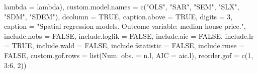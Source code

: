 \documentclass[
  letterpaper,
]{scrbook}
\newenvironment{Shaded}{\begin{snugshade}}{\end{snugshade}}
\newcommand{\AttributeTok}[1]{\textcolor[rgb]{0.40,0.45,0.13}{#1}}
\newcommand{\ConstantTok}[1]{\textcolor[rgb]{0.56,0.35,0.01}{#1}}
\newcommand{\DecValTok}[1]{\textcolor[rgb]{0.68,0.00,0.00}{#1}}
\newcommand{\FunctionTok}[1]{\textcolor[rgb]{0.28,0.35,0.67}{#1}}
\newcommand{\NormalTok}[1]{\textcolor[rgb]{0.00,0.23,0.31}{#1}}
\newcommand{\OtherTok}[1]{\textcolor[rgb]{0.00,0.23,0.31}{#1}}
\newcommand{\SpecialCharTok}[1]{\textcolor[rgb]{0.37,0.37,0.37}{#1}}
\newcommand{\StringTok}[1]{\textcolor[rgb]{0.13,0.47,0.30}{#1}}
\begin{document}
\begin{Shaded}
\begin{Highlighting}[]
                                 \StringTok{\textquotesingle{}lambda\textquotesingle{}} \OtherTok{=} \StringTok{\textquotesingle{}lambda\textquotesingle{}}\NormalTok{),}
          \AttributeTok{custom.model.names =} \FunctionTok{c}\NormalTok{(}\StringTok{"OLS"}\NormalTok{, }\StringTok{"SAR"}\NormalTok{, }\StringTok{"SEM"}\NormalTok{, }\StringTok{"SLX"}\NormalTok{, }\StringTok{"SDM"}\NormalTok{, }\StringTok{"SDEM"}\NormalTok{),}
          \AttributeTok{dcolumn =} \ConstantTok{TRUE}\NormalTok{, }\AttributeTok{caption.above =} \ConstantTok{TRUE}\NormalTok{, }\AttributeTok{digits =} \DecValTok{3}\NormalTok{,}
          \AttributeTok{caption =} \StringTok{"Spatial regression models. Outcome variable: median house price."}\NormalTok{,}
          \AttributeTok{include.nobs =} \ConstantTok{FALSE}\NormalTok{,}
  \AttributeTok{include.loglik =} \ConstantTok{FALSE}\NormalTok{,}
  \AttributeTok{include.aic =} \ConstantTok{FALSE}\NormalTok{,}
  \AttributeTok{include.lr =} \ConstantTok{TRUE}\NormalTok{,}
  \AttributeTok{include.wald =} \ConstantTok{FALSE}\NormalTok{,}
  \AttributeTok{include.fstatistic =} \ConstantTok{FALSE}\NormalTok{,}
  \AttributeTok{include.rmse =} \ConstantTok{FALSE}\NormalTok{,}
  \AttributeTok{custom.gof.rows =} \FunctionTok{list}\NormalTok{(}\StringTok{\textquotesingle{}Num. obs.\textquotesingle{}} \OtherTok{=}\NormalTok{ n.l, }
                         \StringTok{\textquotesingle{}AIC\textquotesingle{}} \OtherTok{=}\NormalTok{ aic.l), }
  \AttributeTok{reorder.gof =} \FunctionTok{c}\NormalTok{(}\DecValTok{1}\NormalTok{, }\DecValTok{3}\SpecialCharTok{:}\DecValTok{6}\NormalTok{, }\DecValTok{2}\NormalTok{))}


\end{Highlighting}
\end{Shaded}
\end{document}
